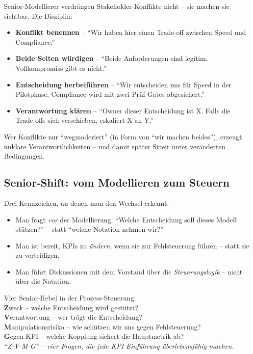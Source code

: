\documentclass[11pt,a4paper,oneside]{article}
\newcommand{\caveatfontfallback}{\itshape}
\newcommand\caveatfont{\caveatfontfallback}%
\newcommand{\akzent}[1]{{\caveatfont\color{lpAmber}#1}}
\newcommand{\fachbegriff}[1]{\textbf{#1}}
\begin{document}
Senior-Modellierer verdrängen Stakeholder-Konflikte nicht -- sie machen sie sichtbar. Die Disziplin:

\begin{itemize}
  \item \fachbegriff{Konflikt benennen} -- ``Wir haben hier einen Trade-off zwischen Speed und Compliance.''
  \item \fachbegriff{Beide Seiten würdigen} -- ``Beide Anforderungen sind legitim. Vollkompromiss gibt es nicht.''
  \item \fachbegriff{Entscheidung herbeiführen} -- ``Wir entscheiden uns für Speed in der Pilotphase, Compliance wird mit zwei Prüf-Gates abgesichert.''
  \item \fachbegriff{Verantwortung klären} -- ``Owner dieser Entscheidung ist X. Falls die Trade-offs sich verschieben, eskaliert X an Y.''
\end{itemize}

Wer Konflikte nur ``wegmoderiert'' (in Form von ``wir machen beides''), erzeugt unklare Verantwortlichkeiten -- und damit später Streit unter veränderten Bedingungen.

\subsection{Senior-Shift: vom Modellieren zum Steuern}

Drei Kennzeichen, an denen man den Wechsel erkennt:

\begin{itemize}
  \item Man fragt \emph{vor} der Modellierung: ``Welche Entscheidung soll dieses Modell stützen?'' -- statt ``welche Notation nehmen wir?''
  \item Man ist bereit, KPIs zu \emph{ändern}, wenn sie zur Fehlsteuerung führen -- statt sie zu verteidigen.
  \item Man führt Diskussionen mit dem Vorstand über die \emph{Steuerungslogik} -- nicht über die Notation.
\end{itemize}

\begin{eselsbox}[Eselsbrücke: \akzent{Z-V-M-G}]
Vier Senior-Hebel in der Prozess-Steuerung:\\[2pt]
\textbf{Z}weck -- welche Entscheidung wird gestützt?\\
\textbf{V}erantwortung -- wer trägt die Entscheidung?\\
\textbf{M}anipulationsrisiko -- wie schützen wir uns gegen Fehlsteuerung?\\
\textbf{G}egen-KPI -- welche Kopplung sichert die Hauptmetrik ab?\\[2pt]
\emph{``Z-V-M-G'' -- vier Fragen, die jede KPI-Einführung überlebensfähig machen.}
\end{eselsbox}
\end{document}
